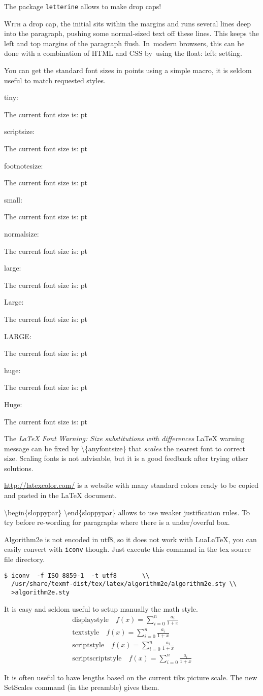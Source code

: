 \documentclass[a4paper]{article}
\makeatletter
\newlength{\scaledx}
\newlength{\scaledy}
\newcommand\SetScales{%
  \pgfpointxy{1}{1}%
  \pgfextractx{\scaledx}{}%
  \pgfextracty{\scaledy}{}%
}
\newcommand\thefontsize[1]{{#1 The current font size is: \f@size pt\par}}
\makeatother
\begin{document}
\vskip5mm
The package \texttt{letterine} allows to make drop caps!

\lettrine[lines=3,slope=-4pt,nindent=-4pt,findent=2pt]{W}{ith} a drop cap, the initial sits
within the margins and runs several lines deep into the paragraph, pushing some
normal-sized text off these lines. This keeps the left and top margins of the
paragraph flush.  In~modern browsers, this can be done with a combination of
HTML and CSS by~using the float: left; setting.

You can get the standard font sizes in points using a simple macro, it is
seldom useful to match requested styles.

tiny: \thefontsize\tiny
scriptsize: \thefontsize\scriptsize
footnotesize: \thefontsize\footnotesize
small: \thefontsize\small
normalsize: \thefontsize\normalsize
large: \thefontsize\large
Large: \thefontsize\Large
LARGE: \thefontsize\LARGE
huge: \thefontsize\huge
Huge: \thefontsize\Huge


The \emph{LaTeX Font Warning: Size substitutions with differences} \LaTeX{}
warning message can be fixed by \textbackslash{}\{anyfontsize\} that
\emph{scales} the nearest font to correct size. Scaling fonts is not advisable,
but it is a good feedback after trying other solutions.



\url{http://latexcolor.com/} is a website with many standard colors ready to be copied
and pasted in the \LaTeX{} document.

\textbackslash{}begin\{sloppypar\} \textbackslash{}end\{sloppypar\} allows to
use weaker justification rules. To try before re-wording for paragraphs where
there is a under/overful box.

Algorithm2e is not encoded in utf8, so it does not work with LuaLaTeX, you can
easily convert with \texttt{iconv} though. Just execute this command in the tex
source file directory.
\begin{verbatim}
$ iconv  -f ISO_8859-1  -t utf8       \\
  /usr/share/texmf-dist/tex/latex/algorithm2e/algorithm2e.sty \\
  >algorithm2e.sty
\end{verbatim}

It is easy and seldom useful to setup manually the math style.
\begin{eqnarray*}
\mathrm{displaystyle}\quad      \displaystyle      f(x) = \sum_{i=0}^{n} \frac{a_i}{1+x} \\
\mathrm{textstyle}\quad         \textstyle         f(x) = \sum_{i=0}^{n} \frac{a_i}{1+x} \\
\mathrm{scriptstyle}\quad       \scriptstyle       f(x) = \sum_{i=0}^{n} \frac{a_i}{1+x} \\
\mathrm{scriptscriptstyle}\quad \scriptscriptstyle f(x) = \sum_{i=0}^{n} \frac{a_i}{1+x}
\end{eqnarray*}


It is often useful to have lengths based on the current tiks picture scale.  The
new SetScales command (in the preamble) gives them.

\end{document}
